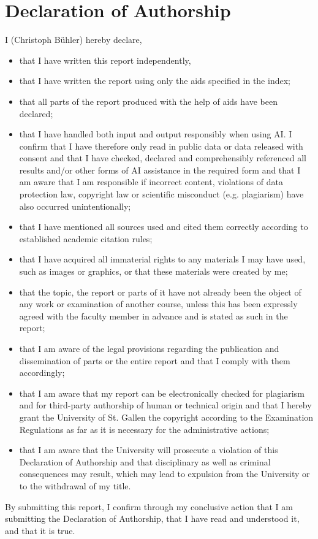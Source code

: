 %
\newpage
\clearpage
\pagestyle{plain}
\pagestyle{empty}
\onecolumn

\section*{Declaration of Authorship}

\noindent I (Christoph Bühler) hereby declare,
\begin{itemize}
	\item that I have written this report independently,
	\item that I have written the report using only the aids specified in the
	      index;
	\item that all parts of the report produced with the help of aids have been
	      declared;
	\item that I have handled both input and output responsibly when using AI. I
	      confirm that I have therefore only read in public data or data released with
	      consent and that I have checked, declared and comprehensibly referenced all results
	      and/or other forms of AI assistance in the required form and that I am aware that I
	      am responsible if incorrect content, violations of data protection law, copyright
	      law or scientific misconduct (e.g. plagiarism) have also occurred unintentionally;
	\item that I have mentioned all sources used and cited them correctly according
	      to established academic citation rules;
	\item that I have acquired all immaterial rights to any materials I may have
	      used, such as images or graphics, or that these materials were created by me;
	\item that the topic, the report or parts of it have not already been the
	      object of any work or examination of another course, unless this has been expressly
	      agreed with the faculty member in advance and is stated as such in the report;
	\item that I am aware of the legal provisions regarding the publication and
	      dissemination of parts or the entire report and that I comply with them
	      accordingly;
	\item that I am aware that my report can be electronically checked for
	      plagiarism and for third-party authorship of human or technical origin and that I
	      hereby grant the University of St. Gallen the copyright according to the
	      Examination Regulations as far as it is necessary for the administrative actions;
	\item that I am aware that the University will prosecute a violation of this
	      Declaration of Authorship and that disciplinary as well as criminal consequences
	      may result, which may lead to expulsion from the University or to the withdrawal of
	      my title.
\end{itemize}

\noindent By submitting this report, I confirm through my conclusive action that I
am submitting the Declaration of Authorship, that I have read and understood it,
and that it is true.
